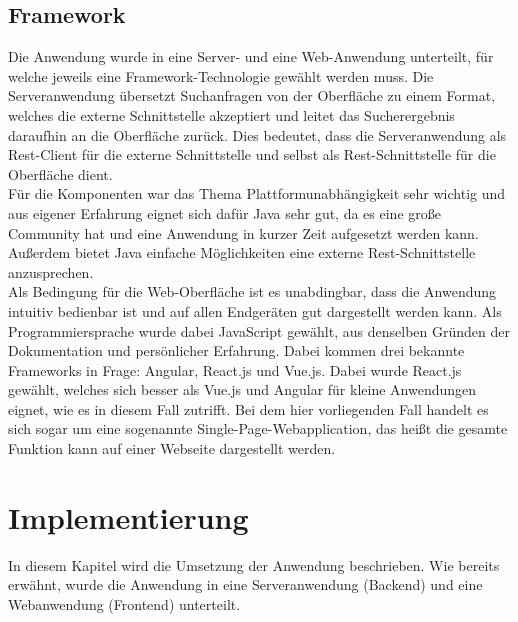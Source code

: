 \documentclass[12pt,twoside,a4paper]{article}
\begin{document}
\begin{sloppypar}
\subsection{Framework}
Die Anwendung wurde in eine Server- und eine Web-Anwendung unterteilt, für welche jeweils eine Framework-Technologie gewählt werden muss. Die Serveranwendung übersetzt Suchanfragen von der Oberfläche zu einem Format, welches die externe Schnittstelle akzeptiert und leitet das Sucherergebnis daraufhin an die Oberfläche zurück. Dies bedeutet, dass die Serveranwendung als Rest-Client für die externe Schnittstelle und selbst als Rest-Schnittstelle für die Oberfläche dient.\\
Für die Komponenten war das Thema Plattformunabhängigkeit sehr wichtig und aus eigener Erfahrung eignet sich dafür Java sehr gut, da es eine große Community hat und eine Anwendung in kurzer Zeit aufgesetzt werden kann. Außerdem bietet Java einfache Möglichkeiten eine externe Rest-Schnittstelle anzusprechen.\\
Als Bedingung für die Web-Oberfläche ist es unabdingbar, dass die Anwendung intuitiv bedienbar ist und auf allen Endgeräten gut dargestellt werden kann. Als Programmiersprache wurde dabei JavaScript gewählt, aus denselben Gründen der Dokumentation und persönlicher Erfahrung. Dabei kommen drei bekannte Frameworks in Frage: Angular, React.js und Vue.js. Dabei wurde React.js gewählt, welches sich besser als Vue.js und Angular für kleine Anwendungen eignet, wie es in diesem Fall zutrifft. Bei dem hier vorliegenden Fall handelt es sich sogar um eine sogenannte Single-Page-Webapplication, das heißt die gesamte Funktion kann auf einer Webseite dargestellt werden.
\newpage
\section{Implementierung}
In diesem Kapitel wird die Umsetzung der Anwendung beschrieben. Wie bereits erwähnt, wurde die Anwendung in eine Serveranwendung (Backend) und eine Webanwendung (Frontend) unterteilt.

\end{sloppypar}
\end{document}
